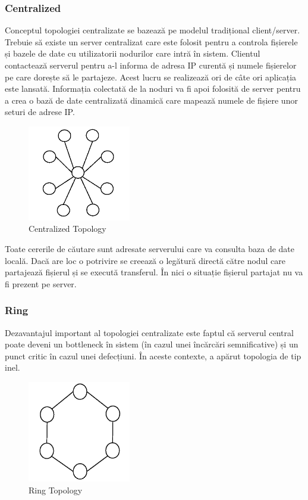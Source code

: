 \subsubsection{Centralized}

Conceptul topologiei centralizate se bazează pe modelul tradițional
client/server. Trebuie să existe un server centralizat care este folosit
pentru a controla fișierele și bazele de date cu utilizatorii nodurilor care
intră în sistem. Clientul contactează serverul pentru a-l informa de adresa IP
curentă și numele fișierelor pe care dorește să le partajeze. Acest lucru se
realizează ori de câte ori aplicația este lansată. Informația colectată de la
noduri va fi apoi folosită de server pentru a crea o bază de date centralizată
dinamică care mapează numele de fișiere unor seturi de adrese IP.

\begin{figure}
  \centering
  \includegraphics[width=0.4\textwidth]{src/img/p2p-systems/centralized}
  \caption{Centralized Topology}
  \label{fig:p2p-systems:centralized}
\end{figure}

Toate cererile de căutare sunt adresate serverului care va consulta baza de
date locală. Dacă are loc o potrivire se creează o legătură directă către
nodul care partajează fișierul și se execută transferul. În nici o situație
fișierul partajat nu va fi prezent pe server.

\subsubsection{Ring}

Dezavantajul important al topologiei centralizate este faptul că serverul
central poate deveni un bottleneck în sistem (în cazul unei încărcări
semnificative) și un punct critic în cazul unei defecțiuni. În aceste
contexte, a apărut topologia de tip inel.

\begin{figure}
  \centering
  \includegraphics[width=0.4\textwidth]{src/img/p2p-systems/ring}
  \caption{Ring Topology}
  \label{fig:p2p-systems:ring}
\end{figure}

